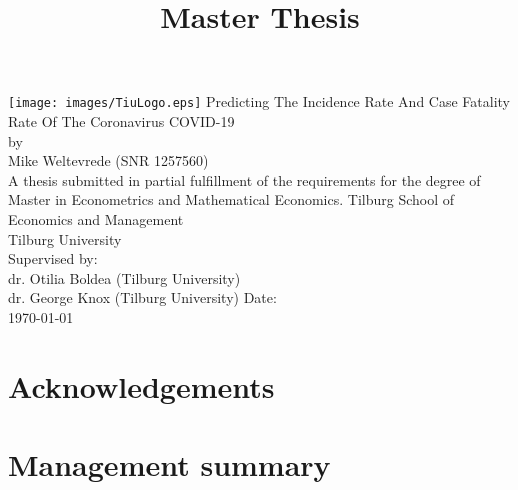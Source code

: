 \documentclass{article}
\title{Master Thesis}
\newcommand\blankpage{
    \null
    \thispagestyle{empty}
    \addtocounter{page}{-1}
    \newpage}
\begin{document}
\afterpage{\blankpage}

\begin{titlepage}
    \centering
 
    \vfill
    
    \texttt{[image: images/TiuLogo.eps]}
    \vskip2cm
    {\huge
        Predicting The Incidence Rate And Case Fatality Rate Of The Coronavirus COVID-19\\
        \large\bigskip
        by\\
        Mike Weltevrede (SNR 1257560)\\
        \vskip2cm
        A thesis submitted in partial fulfillment of the requirements for the degree of Master in Econometrics and Mathematical Economics.
        \vskip0.5cm
        Tilburg School of Economics and Management\\
        Tilburg University\\
        \vskip2cm
        Supervised by:\\
        dr. Otilia Boldea (Tilburg University)\\
  		dr. George Knox (Tilburg University)
		\vfill
        Date:\\
        \today
    }   
    \vfill
    \vfill
\end{titlepage}

\newpage

\tableofcontents

\newpage

\section{Acknowledgements}\label{sec:acknowledgements}

\section{Management summary}\label{sec:management_summary}
\end{document}
